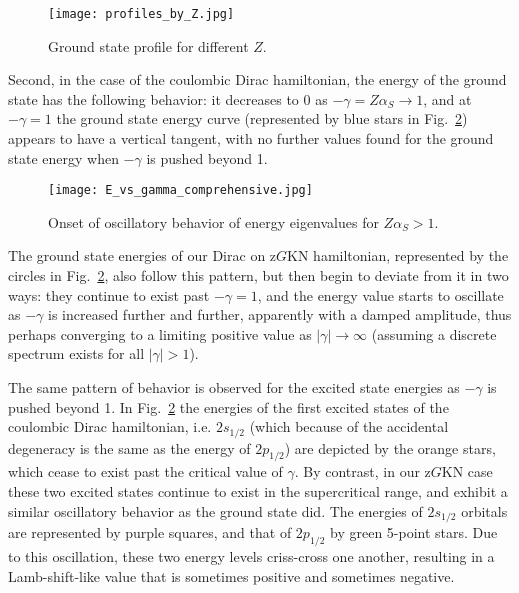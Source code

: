 \documentclass[11 pt]{article}
\renewcommand\({\left(}
\renewcommand\){\right)}
\newcommand\<{\langle}
\renewcommand\>{\rangle}
\newcommand\8{\infty}
\newcommand{\al} {\alpha}\newcommand{\Al}{\Alpha}
\newcommand{\ga} {\gamma}\newcommand{\Ga}{\Gamma}
\begin{document}
\begin{figure}[h!]
\centering
\texttt{[image: profiles\_by\_Z.jpg]}
\caption{Ground state profile for different $Z$.}
\label{fig:Zprofile}
\end{figure}

Second, in the case of the coulombic Dirac hamiltonian, the energy of the ground state has the following behavior: it decreases to 0 as $-\gamma = Z\al_S \to 1$, and at $-\gamma = 1$ the ground state energy curve (represented by blue stars in Fig.~\ref{fig:Zdependence}) appears to have a vertical tangent, with no further values found for the ground state energy when $-\gamma$ is pushed beyond 1. 
\begin{figure}[h!]
\centering
\texttt{[image: E\_vs\_gamma\_comprehensive.jpg]}
\caption{Onset of oscillatory behavior of energy eigenvalues for $Z\alpha_S>1$.}
\label{fig:Zdependence}
\end{figure}

The ground state energies of our Dirac on z$G$KN hamiltonian, represented by the circles in Fig.~\ref{fig:Zdependence}, also follow this pattern, but then begin to deviate from it  in two ways: they continue to exist past $-\ga = 1$, and the energy value starts to oscillate 
as $-\ga$ is increased further and further, apparently with a damped amplitude, thus perhaps converging to a limiting positive value as 
$|\gamma|\to\infty$ (assuming a discrete spectrum exists for all $|\gamma|>1$).

The same pattern of behavior is observed for the excited state energies as $-\gamma$ is pushed beyond 1.  In Fig.~\ref{fig:Zdependence} the energies of the first excited states of the coulombic Dirac hamiltonian, i.e. $2s_{1/2}$ (which because of the accidental degeneracy is the same as the energy of $2p_{1/2}$) are depicted by the orange stars, which cease to exist past the critical value of $\gamma$.  By contrast, in our z$G$KN case these two excited states continue to exist in the supercritical range, and exhibit a similar oscillatory behavior as the ground state did.  The energies of $2s_{1/2}$ orbitals are represented by purple squares, and that of $2p_{1/2}$ by green 5-point stars.  Due to this oscillation, these two energy levels criss-cross one another, resulting in a Lamb-shift-like value that is sometimes positive and sometimes negative.
\end{document}
